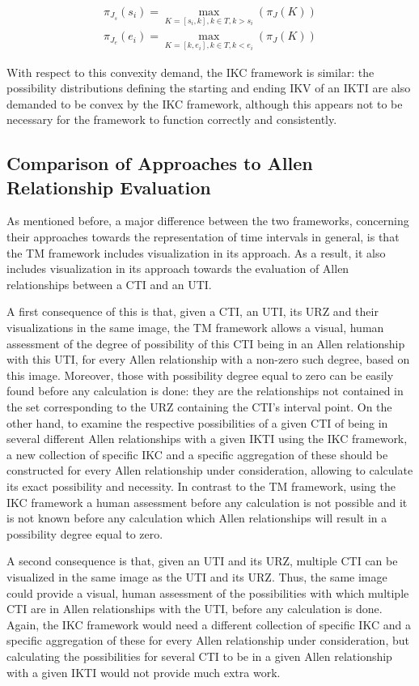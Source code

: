 \begin{align}
\pi_{J_s}(s_i) = \max_{K = \left[s_i, k\right], k \in T, k > s_i}(\pi_J(K)) \nonumber \\
\pi_{J_e}(e_i) = \max_{K = \left[k, e_i\right], k \in T, k < e_i}(\pi_J(K)) \nonumber
\end{align}

With respect to this convexity demand, the IKC framework is similar: the possibility distributions defining the starting and ending IKV of an IKTI are also demanded to be convex by the IKC framework, although this appears not to be necessary for the framework to function correctly and consistently.

\subsection{\label{subsec:comp-eval}Comparison of Approaches to Allen Relationship Evaluation}
As mentioned before, a major difference between the two frameworks, concerning their approaches towards the representation of time intervals in general, is that the TM framework includes visualization in its approach. As a result, it also includes visualization in its approach towards the evaluation of Allen relationships between a CTI and an UTI.

A first consequence of this is that, given a CTI, an UTI, its URZ and their visualizations in the same image, the TM framework allows a visual, human assessment of the degree of possibility of this CTI being in an Allen relationship with this UTI, for every Allen relationship with a non-zero such degree, based on this image. Moreover, those with possibility degree equal to zero can be easily found before any calculation is done: they are the relationships not contained in the set corresponding to the URZ containing the CTI's interval point. On the other hand, to examine the respective possibilities of a given CTI of being in several different Allen relationships with a given IKTI using the IKC framework, a new collection of specific IKC and a specific aggregation of these should be constructed for every Allen relationship under consideration, allowing to calculate its exact possibility and necessity. In contrast to the TM framework, using the IKC framework a human assessment before any calculation is not possible and it is not known before any calculation which Allen relationships will result in a possibility degree equal to zero.

A second consequence is that, given an UTI and its URZ, multiple CTI can be visualized in the same image as the UTI and its URZ. Thus, the same image could provide a visual, human assessment of the possibilities with which multiple CTI are in Allen relationships with the UTI, before any calculation is done. Again, the IKC framework would need a different collection of specific IKC and a specific aggregation of these for every Allen relationship under consideration, but calculating the possibilities for several CTI to be in a given Allen relationship with a given IKTI would not provide much extra work.

